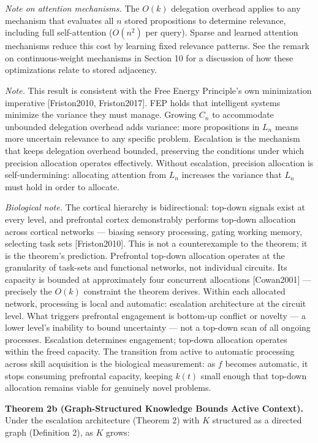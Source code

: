 \documentclass[
]{article}
\begin{document}
\emph{Note on attention mechanisms.} The \(O(k)\) delegation overhead
applies to any mechanism that evaluates all \(n\) stored propositions to
determine relevance, including full self-attention (\(O(n^2)\) per
query). Sparse and learned attention mechanisms reduce this cost by
learning fixed relevance patterns. See the remark on continuous-weight
mechanisms in Section 10 for a discussion of how these optimizations
relate to stored adjacency.

\emph{Note.} This result is consistent with the Free Energy Principle's
own minimization imperative {[}Friston2010, Friston2017{]}. FEP holds
that intelligent systems minimize the variance they must manage. Growing
\(C_n\) to accommodate unbounded delegation overhead adds variance: more
propositions in \(L_n\) means more uncertain relevance to any specific
problem. Escalation is the mechanism that keeps delegation overhead
bounded, preserving the conditions under which precision allocation
operates effectively. Without escalation, precision allocation is
self-undermining: allocating attention from \(L_n\) increases the
variance that \(L_n\) must hold in order to allocate.

\emph{Biological note.} The cortical hierarchy is bidirectional:
top-down signals exist at every level, and prefrontal cortex
demonstrably performs top-down allocation across cortical networks ---
biasing sensory processing, gating working memory, selecting task sets
{[}Friston2010{]}. This is not a counterexample to the theorem; it is
the theorem's prediction. Prefrontal top-down allocation operates at the
granularity of task-sets and functional networks, not individual
circuits. Its capacity is bounded at approximately four concurrent
allocations {[}Cowan2001{]} --- precisely the \(O(k)\) constraint the
theorem derives. Within each allocated network, processing is local and
automatic: escalation architecture at the circuit level. What triggers
prefrontal engagement is bottom-up conflict or novelty --- a lower
level's inability to bound uncertainty --- not a top-down scan of all
ongoing processes. Escalation determines engagement; top-down allocation
operates within the freed capacity. The transition from active to
automatic processing across skill acquisition is the biological
measurement: as \(f\) becomes automatic, it stops consuming prefrontal
capacity, keeping \(k(t)\) small enough that top-down allocation
remains viable for genuinely novel problems.

\textbf{Theorem 2b (Graph-Structured Knowledge Bounds Active Context).}
Under the escalation architecture (Theorem 2) with \(K\) structured as a
directed graph (Definition 2), as \(K\) grows:
\end{document}
